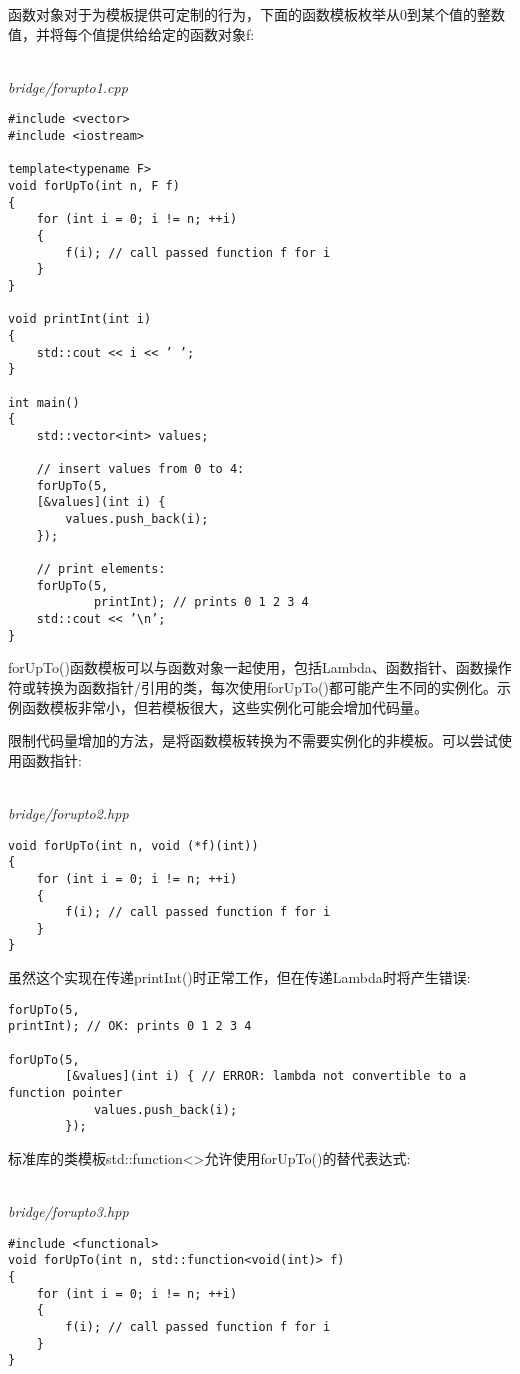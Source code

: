 
函数对象对于为模板提供可定制的行为，下面的函数模板枚举从0到某个值的整数值，并将每个值提供给给定的函数对象f:

\hspace*{\fill} \\ %
\noindent
\textit{bridge/forupto1.cpp}
\begin{lstlisting}[style=styleCXX]
#include <vector>
#include <iostream>

template<typename F>
void forUpTo(int n, F f)
{
	for (int i = 0; i != n; ++i)
	{
		f(i); // call passed function f for i
	}
}

void printInt(int i)
{
	std::cout << i << ’ ’;
}

int main()
{
	std::vector<int> values;
	
	// insert values from 0 to 4:
	forUpTo(5,
	[&values](int i) {
		values.push_back(i);
	});

	// print elements:
	forUpTo(5,
			printInt); // prints 0 1 2 3 4
	std::cout << ’\n’;
}
\end{lstlisting}

forUpTo()函数模板可以与函数对象一起使用，包括Lambda、函数指针、函数操作符或转换为函数指针/引用的类，每次使用forUpTo()都可能产生不同的实例化。示例函数模板非常小，但若模板很大，这些实例化可能会增加代码量。

限制代码量增加的方法，是将函数模板转换为不需要实例化的非模板。可以尝试使用函数指针:

\hspace*{\fill} \\ %
\noindent
\textit{bridge/forupto2.hpp}
\begin{lstlisting}[style=styleCXX]
void forUpTo(int n, void (*f)(int))
{
	for (int i = 0; i != n; ++i)
	{
		f(i); // call passed function f for i
	}
}
\end{lstlisting}

虽然这个实现在传递printInt()时正常工作，但在传递Lambda时将产生错误:

\begin{lstlisting}[style=styleCXX]
forUpTo(5,
printInt); // OK: prints 0 1 2 3 4

forUpTo(5,
		[&values](int i) { // ERROR: lambda not convertible to a function pointer
			values.push_back(i);
		});
\end{lstlisting}

标准库的类模板std::function<>允许使用forUpTo()的替代表达式:

\hspace*{\fill} \\ %
\noindent
\textit{bridge/forupto3.hpp}
\begin{lstlisting}[style=styleCXX]
#include <functional>
void forUpTo(int n, std::function<void(int)> f)
{
	for (int i = 0; i != n; ++i)
	{
		f(i); // call passed function f for i
	}
}
\end{lstlisting}

